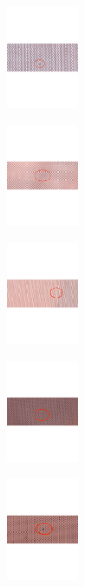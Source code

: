 \begin{figure}[!htbp]
    \centering
    \begin{subfigure}[b]{0.29\textwidth}
        \includegraphics[width=4cm, height=3cm]{figures/GEM/figures/3a.pdf}
        \caption{ }
        \label{fig:O_4a}
    \end{subfigure}
    \begin{subfigure}[b]{0.29\textwidth}
        \includegraphics[width=4cm, height=3cm]{figures/GEM/figures/3b.pdf}
        \caption{ }
        \label{fig:O_4b}
    \end{subfigure}
    \centering
    \begin{subfigure}[b]{0.29\textwidth}
        \includegraphics[width=4cm, height=3cm]{figures/GEM/figures/3c.pdf}
        \caption{ }
        \label{fig:O_4c}
    \end{subfigure}
    \centering
    \begin{subfigure}[b]{0.29\textwidth}
        \includegraphics[width=4cm, height=3cm]{figures/GEM/figures/3d.pdf}
        \caption{ }
        \label{fig:O_5a}
    \end{subfigure}
    \centering
    \begin{subfigure}[b]{0.29\textwidth}
        \includegraphics[width=4cm, height=3cm]{figures/GEM/figures/3e.pdf}

\end{subfigure}
\end{figure}
